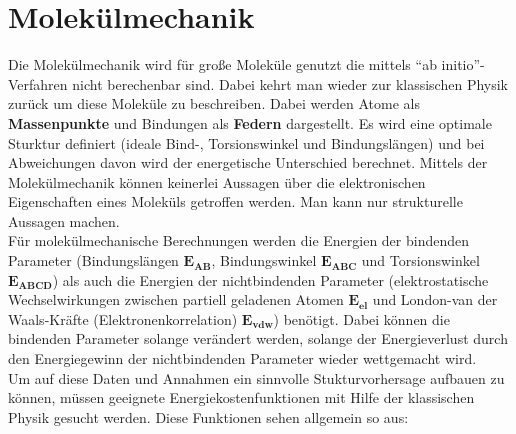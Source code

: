 \documentclass[12pt,a4paper,oneside,normalheadings,abstracton,liststotoc,bibtotoc,titlepage,pdftex]{scrartcl}
\begin{document}
\section{Molekülmechanik}
Die Molekülmechanik wird für große Moleküle genutzt die mittels ``ab initio''-Verfahren nicht berechenbar sind. Dabei kehrt man wieder zur klassischen Physik zurück um diese Moleküle zu beschreiben. Dabei werden Atome als \textbf{Massenpunkte} und Bindungen als \textbf{Federn} dargestellt. Es wird eine optimale Sturktur definiert (ideale Bind-, Torsionswinkel und Bindungslängen) und bei Abweichungen davon wird der energetische Unterschied berechnet. Mittels der Molekülmechanik können keinerlei Aussagen über die elektronischen Eigenschaften eines Moleküls getroffen werden. Man kann nur strukturelle Aussagen machen.\\
Für molekülmechanische Berechnungen werden die Energien der bindenden Parameter (Bindungslängen $\mathbf{E_{AB}}$, Bindungswinkel $\mathbf{E_{ABC}}$ und Torsionswinkel $\mathbf{E_{ABCD}}$) als auch die Energien der nichtbindenden Parameter (elektrostatische Wechselwirkungen zwischen partiell geladenen Atomen $\mathbf{E_{el}}$ und London-van der Waals-Kräfte (Elektronenkorrelation) $\mathbf{E_{vdw}}$) benötigt. Dabei können die bindenden Parameter solange verändert werden, solange der Energieverlust durch den Energiegewinn der nichtbindenden Parameter wieder wettgemacht wird.\\
Um auf diese Daten und Annahmen ein sinnvolle Stukturvorhersage aufbauen zu können, müssen geeignete Energiekostenfunktionen mit Hilfe der klassischen Physik gesucht werden. Diese Funktionen sehen allgemein so aus:
\end{document}
